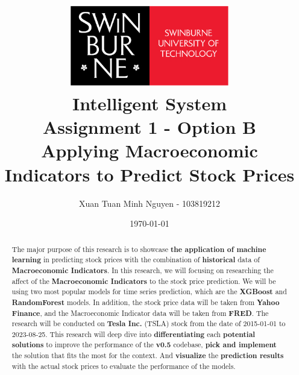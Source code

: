 \documentclass[11pt]{article}
\begin{document}
\begin{titlepage}
    \title{\includegraphics[width=7cm]{./images/swinburne}\\Intelligent System \\ Assignment 1 - Option B \\ Applying Macroeconomic Indicators to Predict Stock Prices}
    \author{Xuan Tuan Minh Nguyen - 103819212}
    \date{\today}
\end{titlepage}

\begin{titlingpage}
    \maketitle
\end{titlingpage}


\pagebreak

\tableofcontents

\newpage

\begin{abstract}
   The major purpose of this research is to showcase \textbf{the application of
   machine learning} in predicting stock prices with the combination of \textbf{historical}
   data of \textbf{Macroeconomic Indicators}. In this research, we will focusing on researching
   the affect of the \textbf{Macroeconomic Indicators} to the stock price prediction.
   We will be using two most popular models for time series prediction, which are
   the \textbf{XGBoost} and \textbf{RandomForest} models. In addition, the stock price data will be taken
   from \textbf{Yahoo Finance}, and the Macroeconomic Indicator data will be taken from
   \textbf{FRED}. The research will be conducted on \textbf{Tesla Inc.} (TSLA) stock from the date of 2015-01-01 to 2023-08-25.
   This research will deep dive into \textbf{differentiating} each \textbf{potential solutions} to improve the
   performance of the \textbf{v0.5} codebase, \textbf{pick and implement} the solution that fits the most for the context.
   And \textbf{visualize} the \textbf{prediction results} with the actual stock prices to evaluate the performance of the models.
\end{abstract}
\end{document}
